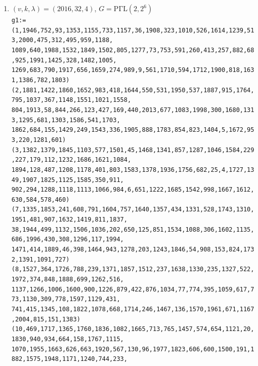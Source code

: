 \documentclass[a4paper,twopage,reqno,12pt]{amsart}
\theoremstyle{definition}
\numberwithin{equation}{section}
\newcommand{\PGaL}{\mathrm{P\Gamma L}}
\newcommand{\Aut}{\mathrm{Aut}}
\begin{document}
\begin{enumerate}
 \item\label{2016324_2} $(v,k,\lambda)=(2016,32,4)$, $G=\PGaL(2,2^6)$\\
    {\tiny
\texttt{g1:=(1,1946,752,93,1353,1155,733,1157,36,1908,323,1010,526,1614,1239,513,2000,475,312,495,959,1188,\\
1089,640,1988,1532,1849,1502,805,1277,73,753,591,260,413,257,882,68,925,1991,1425,328,1482,1005,\\
1269,683,790,1917,656,1659,274,989,9,561,1710,594,1712,1900,818,1631,1386,782,1803)\\
(2,1881,1422,1860,1652,983,418,1644,550,531,1950,537,1887,915,1764,795,1037,367,1148,1551,1021,1558,\\
804,1913,58,844,266,123,427,169,440,2013,677,1083,1998,300,1680,1313,1295,681,1303,1586,541,1703,\\
1862,684,155,1429,249,1543,336,1905,888,1783,854,823,1404,5,1672,953,220,1281,601)\\
(3,1382,1379,1845,1103,577,1501,45,1468,1341,857,1287,1046,1584,229,227,179,112,1232,1686,1621,1084,\\
1894,128,487,1208,1178,401,803,1583,1378,1936,1756,682,25,4,1727,1349,1907,1825,1125,1585,350,911,\\
902,294,1288,1118,1113,1066,984,6,651,1222,1685,1542,998,1667,1612,630,584,578,460)\\
(7,1335,1853,241,608,791,1604,757,1640,1357,434,1331,528,1743,1310,1951,481,907,1632,1419,811,1837,\\ 
38,1944,499,1132,1506,1036,202,650,125,851,1534,1088,306,1602,1135,686,1996,430,308,1296,117,1994,\\ 
1471,414,1889,46,398,1464,943,1278,203,1243,1846,54,908,153,824,1732,1391,1091,727)\\
(8,1527,364,1726,788,239,1371,1857,1512,237,1638,1330,235,1327,522,1972,374,848,1888,699,1262,516,\\
1137,1266,1006,1600,900,1226,879,422,876,1034,77,774,395,1059,617,773,1130,309,778,1597,1129,431,\\
741,415,1345,108,1822,1078,668,1714,246,1467,136,1570,1961,671,1167,2004,815,151,1383)\\(10,469,1717,1365,1760,1836,1082,1665,713,765,1457,574,654,1121,20,1830,940,934,664,158,1767,1115,\\
1070,1955,1663,626,663,1920,567,130,96,1977,1823,606,600,1500,191,1882,1575,1948,1171,1240,744,233,\\
}}
\end{enumerate}
\end{document}

